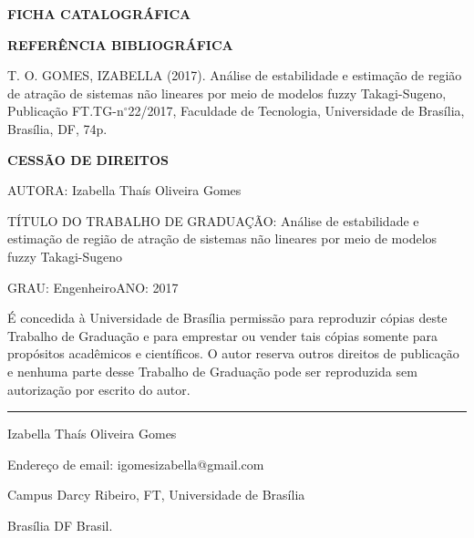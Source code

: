 \noindent \textbf{FICHA CATALOGRÁFICA}

\noindent %

\noindent \medskip{}


\noindent \textbf{REFERÊNCIA BIBLIOGRÁFICA}

T. O. GOMES, IZABELLA (2017). Análise de estabilidade e estimação de região de atração de sistemas não lineares por meio de modelos fuzzy Takagi-Sugeno, Publicação FT.TG-n$^{\circ}$22/2017,
Faculdade de Tecnologia, Universidade de Brasília, Brasília, DF, 74p.

\noindent \bigskip{}
\noindent \textbf{CESSÃO DE DIREITOS}

\noindent AUTORA: Izabella Thaís Oliveira Gomes

TÍTULO DO TRABALHO DE GRADUAÇÃO: Análise de estabilidade e estimação de região de atração de sistemas não lineares por meio de modelos fuzzy Takagi-Sugeno

\noindent \medskip{}

\noindent GRAU: Engenheiro\hfill{}ANO: 2017\hfill{}

\noindent \medskip{}


É concedida à Universidade de Brasília permissão para reproduzir cópias
deste Trabalho de Graduação e para emprestar ou vender tais cópias
somente para propósitos acadêmicos e científicos. O autor reserva
outros direitos de publicação e nenhuma parte desse Trabalho de Graduação
pode ser reproduzida sem autorização por escrito do autor.

\noindent \bigskip{}


\noindent \rule[0.5ex]{1\columnwidth}{1pt}

\noindent Izabella Thaís Oliveira Gomes

\noindent Endereço de email: igomesizabella@gmail.com

\noindent Campus Darcy Ribeiro, FT, Universidade de Brasília

\noindent Brasília \textendash{} DF \textendash{} Brasil.
